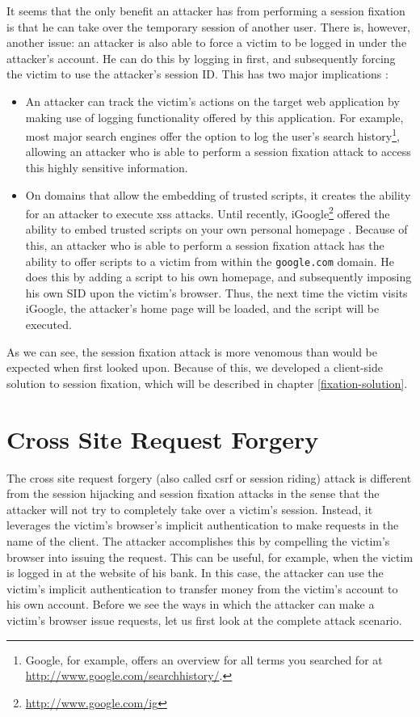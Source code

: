 It seems that the only benefit an attacker has from performing a session fixation is that he can take over the temporary session of another user. There is, however, another issue: an attacker is also able to force a victim to be logged in under the attacker's account. He can do this by logging in first, and subsequently forcing the victim to use the attacker's session ID. This has two major implications \cite{Barth2008}:
\begin{itemize}
	\item An attacker can track the victim's actions on the target web application by making use of logging functionality offered by this application. For example, most major search engines offer the option to log the user's search history\footnote{Google, for example, offers an overview for all terms you searched for at \url{http://www.google.com/searchhistory/}.}, allowing an attacker who is able to perform a session fixation attack to access this highly sensitive information.
	\item On domains that allow the embedding of trusted scripts, it creates the ability for an attacker to execute \gls{xss} attacks. Until recently, iGoogle\footnote{\url{http://www.google.com/ig}} offered the ability to embed trusted scripts on your own personal homepage \cite{Barth2008}. Because of this, an attacker who is able to perform a session fixation attack has the ability to offer scripts to a victim from within the \texttt{google.com} domain. He does this by adding a script to his own homepage, and subsequently imposing his own SID upon the victim's browser. Thus, the next time the victim visits iGoogle, the attacker's home page will be loaded, and the script will be executed.
\end{itemize}

As we can see, the session fixation attack is more venomous than would be expected when first looked upon. Because of this, we developed a client-side solution to session fixation, which will be described in chapter \ref{fixation-solution}.

\section{Cross Site Request Forgery}\label{csrf}

The cross site request forgery (also called \gls{csrf} or session riding) attack is different from the \gls{session hijacking} and \gls{session fixation} attacks in the sense that the attacker will not try to completely take over a victim's session. Instead, it leverages the victim's browser's implicit authentication to make requests in the name of the client. The attacker accomplishes this by compelling the victim's browser into issuing the request. This can be useful, for example, when the victim is logged in at the website of his bank. In this case, the attacker can use the victim's implicit authentication to transfer money from the victim's account to his own account.
Before we see the ways in which the attacker can make a victim's browser issue requests, let us first look at the complete attack scenario.

